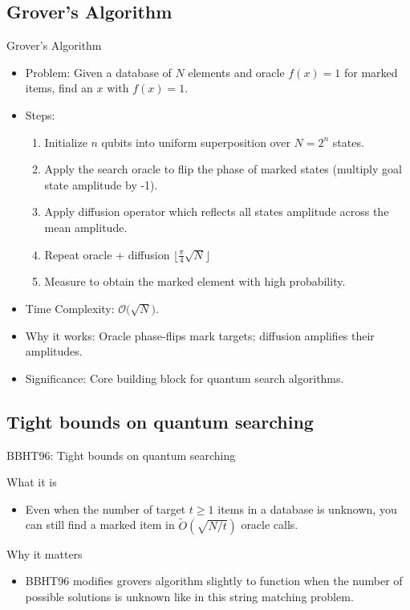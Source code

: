 \documentclass{beamer}
\begin{document}
\subsection{Grover's Algorithm}
\begin{frame}{Grover's Algorithm}
  \begin{itemize}
    \item Problem: Given a database of \(N\) elements and oracle \(f(x)=1\) for marked items, find an \(x\) with \(f(x)=1\).
    \item Steps:
          \begin{enumerate}
            \item Initialize \(n\) qubits into uniform superposition over \(N=2^n\) states.
            \item Apply the search oracle to flip the phase of marked states (multiply goal state amplitude by -1).
            \item Apply diffusion operator which reflects all states amplitude across the mean amplitude.
            \item Repeat oracle + diffusion \(\bigl\lfloor\frac{\pi}{4}\sqrt{N}\bigr\rfloor\)
            \item Measure to obtain the marked element with high probability.
          \end{enumerate}
    \item Time Complexity: \(\mathcal{O}\!\bigl(\sqrt{N}\bigr)\).
    \item Why it works: Oracle phase-flips mark targets; diffusion amplifies their amplitudes.
    \item Significance: Core building block for quantum search algorithms.
  \end{itemize}
\end{frame}
\subsection{Tight bounds on quantum searching}
\begin{frame}{BBHT96: Tight bounds on quantum searching}
  \begin{block}{What it is}
    \begin{itemize}
      \item Even when the number of target \(t \ge 1\) items in a database is unknown,
            you can still find a marked item in \(\widetilde O(\sqrt{N/t})\) oracle calls.

    \end{itemize}
  \end{block}
  \begin{block}{Why it matters}
    \begin{itemize}
      \item BBHT96 modifies grovers algorithm slightly to function when the number of possible solutions is unknown like in this string matching problem.
    \end{itemize}
  \end{block}
\end{frame}
\end{document}

